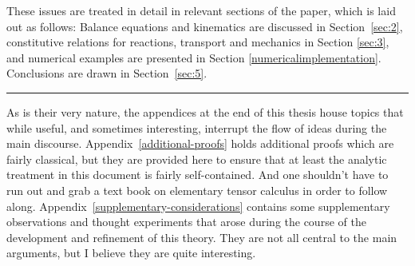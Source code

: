 These issues are treated in detail in relevant sections of the paper,
which is laid out as follows: Balance equations and kinematics are
discussed in Section~\ref{sec:2}, constitutive relations for
reactions, transport and mechanics in Section \ref{sec:3}, and
numerical examples are presented in Section
\ref{numericalimplementation}. Conclusions are drawn in
Section~\ref{sec:5}.

\hrule

As is their very nature, the appendices at the end of this thesis
house topics that while useful, and sometimes interesting, interrupt
the flow of ideas during the main
discourse. Appendix~\ref{additional-proofs} holds additional proofs
which are fairly classical, but they are provided here to ensure that
at least the analytic treatment in this document is fairly
self-contained. And one shouldn't have to run out and grab a text book
on elementary tensor calculus in order to follow
along. Appendix~\ref{supplementary-considerations} contains some
supplementary observations and thought experiments that arose during
the course of the development and refinement of this theory. They are
not all central to the main arguments, but I believe they are quite
interesting. %

%

